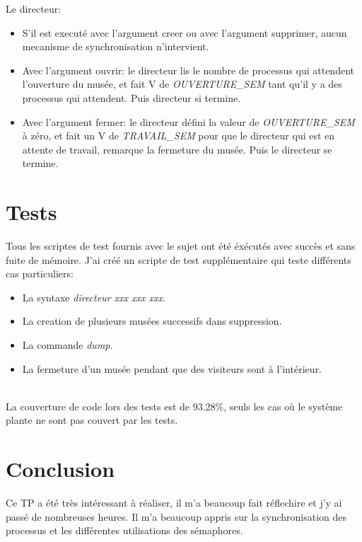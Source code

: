 \documentclass[a4paper,12pt,DIV=16]{scrreprt}
\begin{document}
    Le directeur:
    \begin{itemize}
        \item S'il est executé avec l'argument creer ou avec l'argument supprimer, aucun mecanisme
            de synchronisation n'intervient.
        \item Avec l'argument ouvrir: le directeur lis le nombre de processus qui attendent
            l'ouverture du musée, et fait V de \emph{OUVERTURE\_SEM} tant qu'il y a des
            processus qui attendent. Puis directeur si termine.
        \item Avec l'argument fermer: le directeur défini la valeur de \emph{OUVERTURE\_SEM} à
            zéro, et fait un V de \emph{TRAVAIL\_SEM} pour que le directeur qui est en attente de
            travail, remarque la fermeture du musée. Puis le directeur se termine.
    \end{itemize}

    \section*{Tests}

    Tous les scriptes de test fournis avec le sujet ont été éxécutés avec succès et sans
    fuite de mémoire.
    J'ai créé un scripte de test supplémentaire qui teste différents cas particuliers:
    \begin{itemize}
        \item La syntaxe \textit{directeur xxx xxx xxx}.
        \item La creation de plusieurs musées successifs dans suppression.
        \item La commande \textit{dump}.
        \item La fermeture d'un musée pendant que des visiteurs sont à l'intérieur.
    \end{itemize}

    \ \\

    La couverture de code lors des tests est de 93.28\%, seuls les cas où le système plante ne
    sont pas couvert par les tests.


    \section*{Conclusion}

    
    Ce TP a été très intéressant à réaliser, il m'a beaucoup fait réflechire
    et j'y ai passé de nombreuses heures. Il m'a beaucoup appris sur la
    synchronisation des processus et les différentes utilisations des
    sémaphores.
\end{document}
